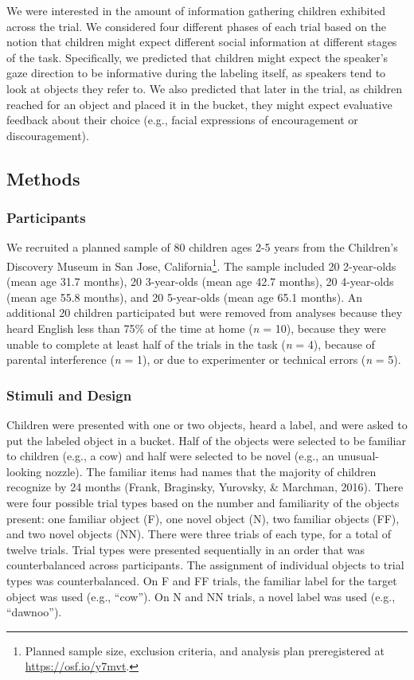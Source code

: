 \documentclass[english,,man]{apa6}
\let\rmarkdownfootnote\footnote%
\def\footnote{\protect\rmarkdownfootnote}
\begin{document}
We were interested in the amount of information gathering children
exhibited across the trial. We considered four different phases of each
trial based on the notion that children might expect different social
information at different stages of the task. Specifically, we predicted
that children might expect the speaker's gaze direction to be
informative during the labeling itself, as speakers tend to look at
objects they refer to. We also predicted that later in the trial, as
children reached for an object and placed it in the bucket, they might
expect evaluative feedback about their choice (e.g., facial expressions
of encouragement or discouragement).

\subsection{Methods}\label{methods}

\subsubsection{Participants}\label{participants}

We recruited a planned sample of 80 children ages 2-5 years from the
Children's Discovery Museum in San Jose, California\footnote{Planned
  sample size, exclusion criteria, and analysis plan preregistered at
  \url{https://osf.io/y7mvt}.}. The sample included 20 2-year-olds (mean
age 31.7 months), 20 3-year-olds (mean age 42.7 months), 20 4-year-olds
(mean age 55.8 months), and 20 5-year-olds (mean age 65.1 months). An
additional 20 children participated but were removed from analyses
because they heard English less than 75\% of the time at home (\emph{n}
= 10), because they were unable to complete at least half of the trials
in the task (\emph{n} = 4), because of parental interference (\emph{n} =
1), or due to experimenter or technical errors (\emph{n} = 5).

\subsubsection{Stimuli and Design}\label{stimuli-and-design}

Children were presented with one or two objects, heard a label, and were
asked to put the labeled object in a bucket. Half of the objects were
selected to be familiar to children (e.g., a cow) and half were selected
to be novel (e.g., an unusual-looking nozzle). The familiar items had
names that the majority of children recognize by 24 months (Frank,
Braginsky, Yurovsky, \& Marchman, 2016). There were four possible trial
types based on the number and familiarity of the objects present: one
familiar object (F), one novel object (N), two familiar objects (FF),
and two novel objects (NN). There were three trials of each type, for a
total of twelve trials. Trial types were presented sequentially in an
order that was counterbalanced across participants. The assignment of
individual objects to trial types was counterbalanced. On F and FF
trials, the familiar label for the target object was used (e.g.,
\enquote{cow}). On N and NN trials, a novel label was used (e.g.,
\enquote{dawnoo}).
\end{document}
